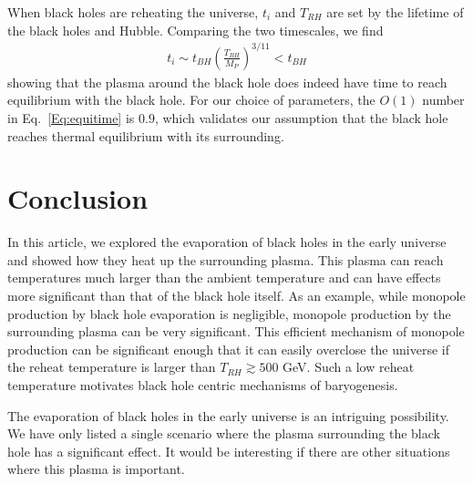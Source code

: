 \documentclass[superscriptaddress,groupedaddress,nofootnoteinbib,11pt]{article}
\newcommand{\MP}{M_P}
\newcommand\eea{\end{eqnarray}}
\newcommand\bea{\begin{eqnarray}}
\begin{document}
When black holes are reheating the universe, $t_i$ and $T_{RH}$ are set by the lifetime of the black holes and Hubble.  Comparing the two timescales, we find
\bea\label{Eq:equitime}
t_i \sim t_{BH} \left ( \frac{T_{BH}}{\MP} \right )^{3/11} < t_{BH}
\eea
showing that the plasma around the black hole does indeed have time to reach equilibrium with the black hole. For our choice of parameters, the $O(1)$ number in Eq.~\ref{Eq:equitime} is $0.9$, which validates our assumption that the black hole reaches thermal equilibrium with its surrounding.


\section{Conclusion}\label{Sec: conclusion}


In this article, we explored the evaporation of black holes in the early universe and showed how they heat up the surrounding plasma.  This plasma can reach temperatures much larger than the ambient temperature and can have effects more significant than that of the black hole itself.  As an example, while monopole production by black hole evaporation is negligible,  monopole production by the surrounding plasma can be very significant.  This efficient mechanism of monopole production can be significant enough that it can easily overclose the universe if the reheat temperature is larger than $T_{RH} \gtrsim 500$ GeV.  Such a low reheat temperature motivates black hole centric mechanisms of baryogenesis.

The evaporation of black holes in the early universe is an intriguing possibility.  We have only listed a single scenario where the plasma surrounding the black hole has a significant effect.  It would be interesting if there are other situations where this plasma is important.


\appendix




\end{document}
